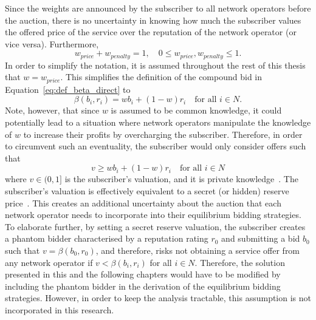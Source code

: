  Since the weights are announced by the subscriber to all network operators before the auction, there is no uncertainty in knowing how much the subscriber values the offered price of the service over the reputation of the network operator (or vice versa). Furthermore,
\begin{equation}
	w_{price} + w_{penalty} = 1,\quad 0\le w_{price},w_{penalty} \le 1.
\end{equation}
In order to simplify the notation, it is assumed throughout the rest of this thesis that $w=w_{price}$. This simplifies the definition of the compound bid in Equation~\eqref{eq:def_beta_direct} to
\begin{equation}
  \beta(b_i, r_i) = wb_i + (1-w)r_i\quad\text{for all } i\in N.
\end{equation}
Note, however, that since $w$ is assumed to be common knowledge, it could potentially lead to a situation where network operators manipulate the knowledge of $w$ to increase their profits by overcharging the subscriber. Therefore, in order to circumvent such an eventuality, the subscriber would only consider offers such that
\begin{equation}
	\label{eq:subscribers_valuation_direct}
	v\geq wb_i + (1-w)r_i \quad\text{for all } i\in N
\end{equation}
where $v\in (0,1]$ is the subscriber's valuation, and it is private knowledge~\cite{DMLeBodic00}. The subscriber's valuation is effectively equivalent to a secret (or hidden) reserve price~\cite{Vincent1995575,LiPerrigne1999,BajariHortacsu2003}. This creates an additional uncertainty about the auction that each network operator needs to incorporate into their equilibrium bidding strategies. To elaborate further, by setting a secret reserve valuation, the subscriber creates a phantom bidder characterised by a reputation rating $r_0$ and submitting a bid $b_0$ such that $v=\beta(b_0,r_0)$, and therefore, risks not obtaining a service offer from any network operator if $v < \beta(b_i,r_i)$ for all $i\in N$. Therefore, the solution presented in this and the following chapters would have to be modified by including the phantom bidder in the derivation of the equilibrium bidding strategies. However, in order to keep the analysis tractable, this assumption is not incorporated in this research.
	
